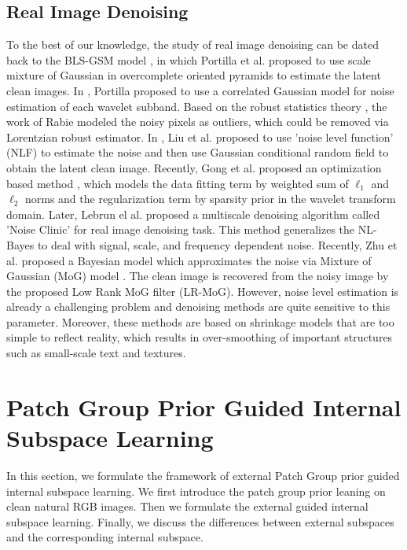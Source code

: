 \documentclass[10pt,twocolumn,letterpaper]{article}
\begin{document}
\subsection{Real Image Denoising}
To the best of our knowledge, the study of real image denoising can be dated back to the BLS-GSM model \cite{blsgsm}, in which Portilla et al. proposed to use scale mixture of Gaussian in overcomplete oriented pyramids to estimate the latent clean images. In \cite{fullyblind}, Portilla proposed to use a correlated Gaussian model for noise estimation of each wavelet subband. Based on the robust statistics theory \cite{huber2011robust}, the work of Rabie \cite{rabie2005robust} modeled the noisy pixels as outliers, which could be removed via Lorentzian robust estimator. In \cite{Liu2008}, Liu et al. proposed to use 'noise level function' (NLF) to estimate the noise and then use Gaussian conditional random field to obtain the latent clean image. Recently, Gong et al. proposed an optimization based method \cite{almapg}, which models the data fitting term by weighted sum of $\ell_{1}$ and $\ell_{2}$ norms and the regularization term by sparsity prior in the wavelet transform domain. Later, Lebrun el al. proposed a multiscale denoising algorithm called 'Noise Clinic' \cite{noiseclinic} for real image denoising task. This method generalizes the NL-Bayes \cite{nlbayes} to deal with signal, scale, and frequency dependent noise. Recently, Zhu et al. proposed a Bayesian model \cite{Zhu_2016_CVPR} which approximates the noise via Mixture of Gaussian (MoG) model \cite{Bishop}. The clean image is recovered from the noisy image by the proposed Low Rank MoG filter (LR-MoG). However, noise level estimation is already a challenging problem and denoising methods are quite sensitive to this parameter. Moreover, these methods are based on shrinkage models that are too simple to reflect reality, which results in over-smoothing of important structures such as small-scale text and textures. 

\section{Patch Group Prior Guided Internal Subspace Learning}
In this section, we formulate the framework of external Patch Group prior guided internal subspace learning. We first introduce the patch group prior leaning on clean natural RGB images. Then we formulate the external guided internal subspace learning. Finally, we discuss the differences between external subspaces and the corresponding internal subspace.
\end{document}
